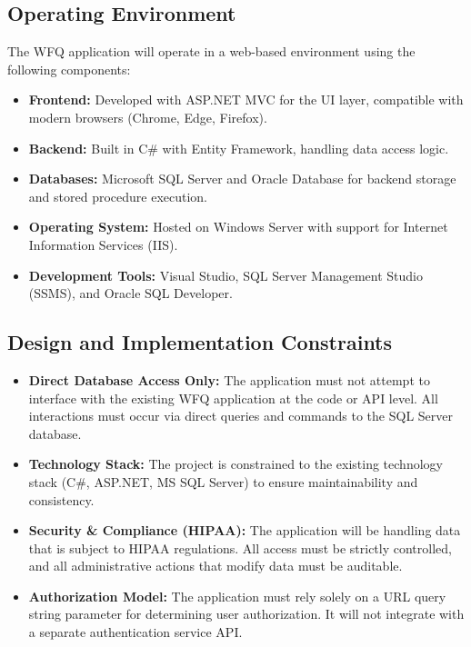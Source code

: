 \documentclass[12pt]{article}
\begin{document}
\subsection{Operating Environment}
The WFQ application will operate in a web-based environment using the following components:
\begin{itemize}
    \item \textbf{Frontend:} Developed with ASP.NET MVC for the UI layer, compatible with
    modern browsers (Chrome, Edge, Firefox).
    \item \textbf{Backend:} Built in C\# with Entity Framework, handling data access logic.
    \item \textbf{Databases:} Microsoft SQL Server and Oracle Database for backend storage and
    stored procedure execution.
    \item \textbf{Operating System:} Hosted on Windows Server with support for Internet
    Information Services (IIS).
    \item \textbf{Development Tools:} Visual Studio, SQL Server Management Studio (SSMS), and
    Oracle SQL Developer.
\end{itemize}

\subsection{Design and Implementation Constraints}
\begin{itemize}
    \item \textbf{Direct Database Access Only:} The application must not attempt to interface
    with the existing WFQ application at the code or API level. All interactions must occur
    via direct queries and commands to the SQL Server database.
    \item \textbf{Technology Stack:} The project is constrained to the existing technology
    stack (C\#, ASP.NET, MS SQL Server) to ensure maintainability and consistency.
    \item \textbf{Security \& Compliance (HIPAA):} The application will be handling data that
    is subject to HIPAA regulations. All access must be strictly controlled, and all
    administrative actions that modify data must be auditable.
    \item \textbf{Authorization Model:} The application must rely solely on a URL query string
    parameter for determining user authorization. It will not integrate with a separate
    authentication service API.
\end{itemize}
\end{document}
